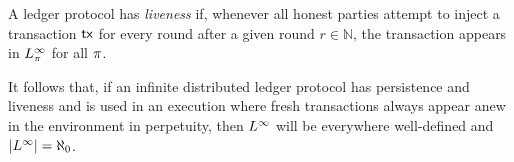 \begin{definition}[Liveness]
  A ledger protocol has \emph{liveness} if, whenever all honest parties attempt
  to inject a transaction $\textsf{tx}$ for every round after a given round
  $r \in \mathbb{N}$, the transaction appears in $L_\pi^\infty$ for all
  $\pi$.
\end{definition}

It follows that, if an infinite distributed ledger protocol has persistence and
liveness and is used in an execution where fresh transactions always appear
anew in the environment in perpetuity, then $L^\infty$ will be
everywhere well-defined and $|L^\infty| = \aleph_0$.

